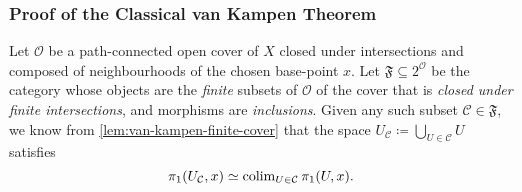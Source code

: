 \subsubsection{Proof of the Classical van Kampen Theorem}

Let \(\mathcal{O}\) be a path-connected open cover of \(X\) closed under
intersections and composed of neighbourhoods of the chosen base-point \(x\). Let
\(\mathfrak{F} \subseteq 2^{\mathcal{O}}\) be the category whose objects are the
\emph{finite} subsets of \(\mathcal{O}\) of the cover that is \emph{closed under
    finite intersections}, and morphisms are \emph{inclusions}. Given any such
subset \(\mathcal{C} \in \mathfrak F\), we know from
\cref{lem:van-kampen-finite-cover} that the space
\(U_{\mathcal{C}} \coloneq \bigcup_{U \in \mathcal{C}} U\) satisfies
\begin{equation}\label{eq:van-kampen-grp-1}
    \pi_1(U_{\mathcal{C}}, x) \simeq \operatorname{colim}_{U \in \mathcal{C}} \pi_1(U, x).
\end{equation}

